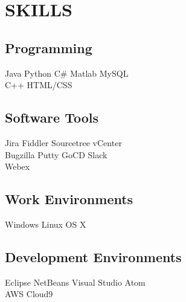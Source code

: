 \documentclass[]{deedy-resume-openfont}
\begin{document}
\begin{minipage}[t]{0.34\textwidth}
\section{SKILLS}
\subsection{Programming}
Java \textbullet{}   Python \textbullet{} C\selectfont\# \textbullet{} Matlab \textbullet{} MySQL \\
C++ \textbullet{} HTML/CSS  \\ 
\sectionsep
\subsection{Software Tools}
Jira \textbullet{}   Fiddler \textbullet{} Sourcetree \textbullet{} vCenter \\ Bugzilla \textbullet{} Putty \textbullet{} GoCD \textbullet{} Slack \\
Webex
\sectionsep
\subsection{Work Environments}
Windows \textbullet{}   Linux \textbullet{} OS X
\sectionsep
\subsection{Development Environments}
Eclipse \textbullet{}   NetBeans \textbullet{} Visual Studio \textbullet{} Atom \\ AWS Cloud9
\sectionsep


%
%

\end{minipage} 
\hfill
\end{document}

